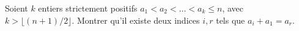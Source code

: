 Soient $k$ entiers strictement positifs $a_1 < a_2 < \ldots < a_k \leq n$, avec $k > \lfloor (n + 1)/2 \rfloor$. Montrer qu'il existe deux indices $i, r$ tels que $a_i + a_1 = a_r$.
